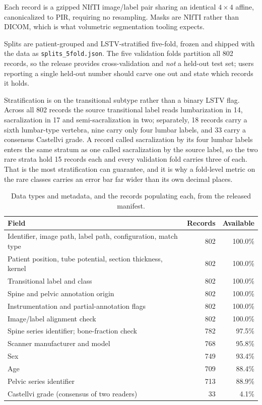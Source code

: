 \documentclass[aapm,mph,amsmath,amssymb,reprint]{revtex4-2}
\begin{document}
Each record is a gzipped NIfTI image/label pair sharing an identical $4\times4$ affine,
canonicalized to PIR, requiring no resampling. Masks are NIfTI rather than DICOM, which is what volumetric segmentation tooling expects.

Splits are patient-grouped and LSTV-stratified five-fold, frozen and shipped with the data
as \texttt{splits\_5fold.json}. The five validation folds partition all 802 records, so the
release provides cross-validation and \emph{not} a held-out test set; users reporting a
single held-out number should carve one out and state which records it holds.

Stratification is on the transitional subtype rather than a binary LSTV flag. Across all
802 records the source transitional label reads lumbarization in 14, sacralization in 17
and semi-sacralization in two; separately, 18 records carry a sixth lumbar-type vertebra,
nine carry only four lumbar labels, and 33 carry a consensus Castellvi grade. A record
called sacralization by its four lumbar labels enters the same stratum as one called
sacralization by the source label, so the two rare strata hold 15 records each and every
validation fold carries three of each. That is the most stratification can guarantee, and
it is why a fold-level metric on the rare classes carries an error bar far wider than its
own decimal places.

\begin{table}[t]
\caption{\label{tab:completeness}Data types and metadata, and the records populating
each, from the released manifest.}
\begin{ruledtabular}
\begin{tabular}{lrr}
Field & Records & Available \\
\hline
Identifier, image path, label path, configuration, match type & 802 & 100.0\% \\
Patient position, tube potential, section thickness, kernel & 802 & 100.0\% \\
Transitional label and class & 802 & 100.0\% \\
Spine and pelvic annotation origin & 802 & 100.0\% \\
Instrumentation and partial-annotation flags & 802 & 100.0\% \\
Image/label alignment check & 802 & 100.0\% \\
Spine series identifier; bone-fraction check & 782 & 97.5\% \\
Scanner manufacturer and model & 768 & 95.8\% \\
Sex & 749 & 93.4\% \\
Age & 709 & 88.4\% \\
Pelvic series identifier & 713 & 88.9\% \\
Castellvi grade (consensus of two readers) & 33 & 4.1\% \\
\end{tabular}
\end{ruledtabular}
\end{table}
\end{document}
